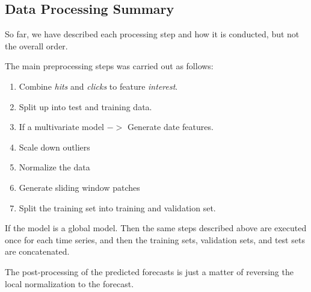 \subsection{Data Processing Summary}
So far, we have described each processing step and how it is conducted, but not the overall
order.

The main preprocessing steps was carried out as follows:
\begin{enumerate}
  \item Combine \textit{hits} and \textit{clicks} to feature \textit{interest}.
  \item Split up into test and training data.
  \item If a multivariate model $->$ Generate date features.
  \item Scale down outliers %
  \item Normalize the data %
  \item Generate sliding window patches %
  \item Split the training set into training and validation set.
\end{enumerate}

If the model is a global model. Then the same steps described above are executed once
for each time series, and then the training sets, validation sets, and test sets are concatenated.

The post-processing of the predicted forecasts is just a matter of reversing the local
normalization to the forecast.
